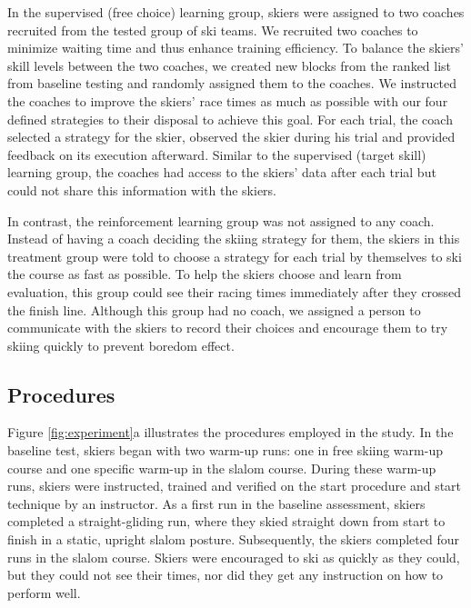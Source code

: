 \documentclass[pdflatex,sn-mathphys-num]{sn-jnl}%
\theoremstyle{thmstyleone}%
\theoremstyle{thmstyletwo}%
\theoremstyle{thmstylethree}%
\begin{document}
In the supervised (free choice) learning group, skiers were assigned to two coaches recruited from the tested group of ski teams. We recruited two coaches to minimize waiting time and thus enhance training efficiency. To balance the skiers' skill levels between the two coaches, we created new blocks from the ranked list from baseline testing and randomly assigned them to the coaches. We instructed the coaches to improve the skiers' race times as much as possible with our four defined strategies to their disposal to achieve this goal. For each trial, the coach selected a strategy for the skier, observed the skier during his trial and provided feedback on its execution afterward. Similar to the supervised (target skill) learning group, the coaches had access to the skiers' data after each trial but could not share this information with the skiers.

In contrast, the reinforcement learning group was not assigned to any coach. Instead of having a coach deciding the skiing strategy for them, the skiers in this treatment group were told to choose a strategy for each trial by themselves to ski the course as fast as possible. To help the skiers choose and learn from evaluation, this group could see their racing times immediately after they crossed the finish line. Although this group had no coach, we assigned a person to communicate with the skiers to record their choices and encourage them to try skiing quickly to prevent boredom effect.

\subsection{Procedures}\label{subsec4}
Figure \ref{fig:experiment}a illustrates the procedures employed in the study. 
In the baseline test, skiers began with two warm-up runs: one in free skiing warm-up course and one specific warm-up in the slalom course. During these warm-up runs, skiers were instructed, trained and verified on the start procedure and start technique by an instructor. As a first run in the baseline assessment, skiers completed a straight-gliding run, where they skied straight down from start to finish in a static, upright slalom posture. Subsequently, the skiers completed four runs in the slalom course. Skiers were encouraged to ski as quickly as they could, but they could not see their times, nor did they get any instruction on how to perform well. 
\end{document}
